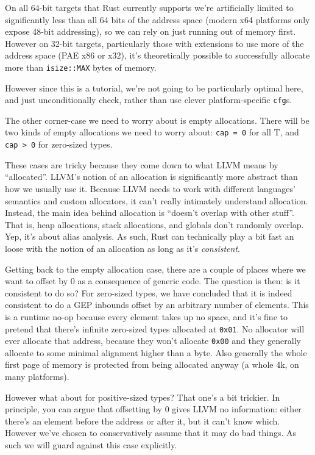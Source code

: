 \documentclass[a4paper,]{book}
\begin{document}
On all 64-bit targets that Rust currently supports we're artificially
limited to significantly less than all 64 bits of the address space
(modern x64 platforms only expose 48-bit addressing), so we can rely on
just running out of memory first. However on 32-bit targets,
particularly those with extensions to use more of the address space (PAE
x86 or x32), it's theoretically possible to successfully allocate more
than \texttt{isize::MAX} bytes of memory.

However since this is a tutorial, we're not going to be particularly
optimal here, and just unconditionally check, rather than use clever
platform-specific \texttt{cfg}s.

The other corner-case we need to worry about is empty allocations. There
will be two kinds of empty allocations we need to worry about:
\texttt{cap\ =\ 0} for all T, and \texttt{cap\ \textgreater{}\ 0} for
zero-sized types.

These cases are tricky because they come down to what LLVM means by
``allocated''. LLVM's notion of an allocation is significantly more
abstract than how we usually use it. Because LLVM needs to work with
different languages' semantics and custom allocators, it can't really
intimately understand allocation. Instead, the main idea behind
allocation is ``doesn't overlap with other stuff''. That is, heap
allocations, stack allocations, and globals don't randomly overlap. Yep,
it's about alias analysis. As such, Rust can technically play a bit fast
an loose with the notion of an allocation as long as it's
\emph{consistent}.

Getting back to the empty allocation case, there are a couple of places
where we want to offset by 0 as a consequence of generic code. The
question is then: is it consistent to do so? For zero-sized types, we
have concluded that it is indeed consistent to do a GEP inbounds offset
by an arbitrary number of elements. This is a runtime no-op because
every element takes up no space, and it's fine to pretend that there's
infinite zero-sized types allocated at \texttt{0x01}. No allocator will
ever allocate that address, because they won't allocate \texttt{0x00}
and they generally allocate to some minimal alignment higher than a
byte. Also generally the whole first page of memory is protected from
being allocated anyway (a whole 4k, on many platforms).

However what about for positive-sized types? That one's a bit trickier.
In principle, you can argue that offsetting by 0 gives LLVM no
information: either there's an element before the address or after it,
but it can't know which. However we've chosen to conservatively assume
that it may do bad things. As such we will guard against this case
explicitly.
\end{document}
